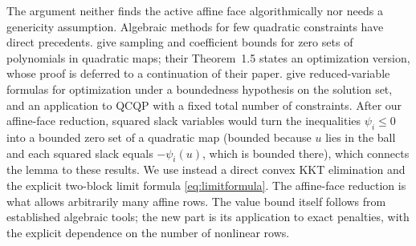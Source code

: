 The argument neither finds the active affine face algorithmically nor
needs a genericity assumption. Algebraic methods for few quadratic
constraints have direct precedents.
\citet[Theorem~1.2]{GrigorievPasechnik2005} give sampling and coefficient
bounds for zero sets of polynomials in quadratic maps; their Theorem~1.5
states an
optimization version, whose proof is deferred to a continuation of their
paper. \citet[Sections~6.2--7.2 and~8.5]{KammingaRudolph2025} give
reduced-variable formulas for optimization under a boundedness hypothesis
on the solution set, and an application to QCQP with a fixed total number
of constraints. After our affine-face reduction, squared slack variables
would turn the inequalities $\psi_i\le0$ into a bounded zero set of a
quadratic map (bounded because $u$ lies in the ball and each squared
slack equals $-\psi_i(u)$, which is bounded there), which connects the lemma to these results. We use
instead a direct convex KKT elimination and the explicit two-block limit
formula \eqref{eq:limitformula}. The affine-face reduction is what allows
arbitrarily many affine rows. The value bound itself follows from
established algebraic tools; the new part is its application to exact
penalties, with the explicit dependence on the number of nonlinear rows.

